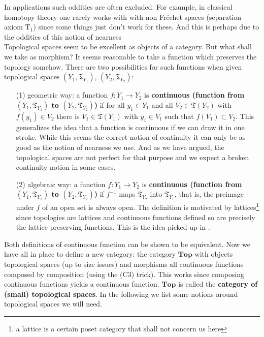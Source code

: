 \begin{exa}
\begin{enumerate}
\end{enumerate}
In applications such oddities are often excluded. For example, in classical homotopy theory one rarely works with with non Fr\'e{ch}et spaces (separation axiom $\textrm{T}_{1}$) since some things just don't work for these. And this is perhaps due to the oddities of this notion of nearness
\\
Topological spaces seem to be excellent as objects of a category. But what shall we take as morphism? It seems reasonable to take a function which preserves the topology somehow. There are two possibilities for such functions when given topological spaces $(Y_{1},\mathfrak{T}_{Y_{1}})$, $(Y_{2},\mathfrak{T}_{Y_{2}})$:
\begin{enumerate}
\item[(1)]
geometric way: a function $f \colon Y_{1} \rightarrow Y_{2}$ is \textbf{continuous (function from $(Y_{1},\mathfrak{T}_{Y_{1}})$ to $(Y_{2},\mathfrak{T}_{Y_{2}})$)} if for all $y_{1} \in Y_{1}$ and all $V_{2} \in \mathfrak{T}(Y_{2})$ with $f(y_{1}) \in V_{2}$ there is $V_{1} \in \mathfrak{T}(Y_{1})$ with $y_{1} \in V_{1}$ such that $f(V_{1}) \subset V_{2}$. This generalizes the idea that a function is continuous if we can draw it in one stroke. While this seems the correct notion of continuity it can only be as good as the notion of nearness we use. And as we have argued, the topological spaces are not perfect for that purpose and we expect a broken continuity notion in some cases.
\item[(2)]
algebraic way: a function $f \colon Y_{1} \rightarrow Y_{2}$ is \textbf{continuous (function from $(Y_{1},\mathfrak{T}_{Y_{1}})$ to $(Y_{2},\mathfrak{T}_{Y_{2}})$)} if $f^{-1}$ maps $\mathfrak{T}_{Y_{2}}$ into $\mathfrak{T}_{Y_{1}}$, that is, the preimage under $f$ of an open set is always open. The definition is motivated by lattices\footnote{a lattice is a certain poset category that shall not concern us here} since topologies are lattices and continuous functions defined so are precisely the lattice preserving functions. This is the idea picked up in \cite{797789bc}.
\end{enumerate}
Both definitions of continuous function can be shown to be equivalent. Now we have all in place to define a new category: the category $\mathbf{Top}$ with objects topological spaces (up to size issues) and morphisms all continuous functions composed by composition (using the (C3) trick). This works since composing continuous functions yields a continuous function. $\mathbf{Top}$ is called the \textbf{category of (small) topological spaces}. In the following we list some notions around topological spaces we will need.

\end{exa}
